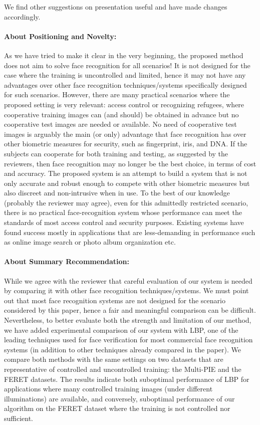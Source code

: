 \documentclass[11pt]{article}
\begin{document}
We find other suggestions on presentation useful and have made changes accordingly. 

\paragraph{About Positioning and Novelty:}
As we have tried to make it clear in the very beginning, the proposed method does not aim to solve face 
recognition for all scenarios! It is not designed for the case where the training is uncontrolled and limited, hence it
may not have any advantages over other face recognition techniques/systems specifically designed for such scenarios. 
However, there are many practical scenarios where the proposed setting is very relevant: access control
or recognizing refugees, where cooperative training images can (and should) be obtained in advance but no cooperative test
images are needed or available. No need of cooperative test images is arguably the main (or only) advantage that 
face recognition has over other biometric measures for security, such as fingerprint, iris, and DNA. 
If the subjects can cooperate for both training and testing, as suggested by the reviewers, then face 
recognition may no longer be the best choice, in terms of cost and accuracy. The proposed system is an attempt
to build a system that is not only accurate and robust enough to compete with other biometric measures but also 
discreet and non-intrusive when in use. To the best of our knowledge (probably the reviewer may agree), even 
for this admittedly restricted scenario, there is no practical face-recognition system whose performance can meet
the standards of most access control and security purposes. Existing systems have found success  mostly in applications
that are less-demanding in performance such as online image search or photo album organization etc. 

\paragraph{About Summary Recommendation:} While we agree with the reviewer that careful evaluation of our
system is needed by comparing it with other face recognition techniques/systems. We must point out that most face recognition systems are not designed for the scenario considered by this paper, hence a fair and meaningful comparison can be difficult. Nevertheless, to better evaluate both the strength and limitation of our method, we have added experimental comparison of our system with LBP, one of the leading techniques used for face verification for most commercial face recognition systems (in addition to other techniques already compared in the paper). We compare both methods with the same settings on two datasets that are representative of controlled and uncontrolled training: the Multi-PIE and the FERET
datasets.  The results indicate both suboptimal performance of LBP for applications where many controlled training images (under different illuminations) are available, and conversely, suboptimal performance of our algorithm on the FERET dataset where the training is not controlled nor sufficient.
\end{document}
